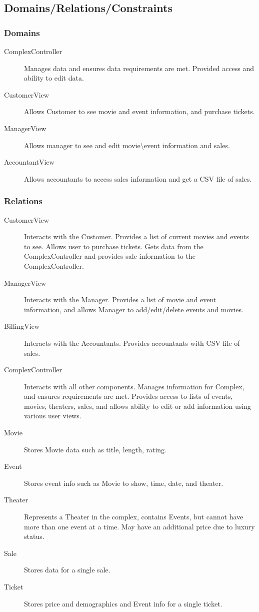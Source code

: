 \documentclass[12pt,titlepage,letterpaper]{article}
\begin{document}
\subsection{Domains/Relations/Constraints}
\subsubsection{Domains}
  	\begin{description}
\item[ComplexController] Manages data and ensures data requirements are met.  Provided access and ability to edit data.
\item[CustomerView] Allows Customer to see movie and event information, and purchase tickets.
\item[ManagerView] Allows manager to see and edit movie\textbackslash event information and sales.
\item[AccountantView] Allows accountants to access sales information and get a CSV file of sales.
\end{description}
\subsubsection{Relations}
\begin{description}
\item[CustomerView] Interacts with the Customer. Provides a list of current movies and events to see.  Allows user to purchase tickets. Gets data from the ComplexController and provides sale information to the ComplexController.

\item[ManagerView] Interacts with the Manager. Provides a list of movie and event information, and allows Manager to add/edit/delete events and movies.

\item[BillingView] Interacts with the Accountants.  Provides accountants with CSV file of sales.

\item[ComplexController] Interacts with all other components.  Manages information for Complex, and ensures requirements are met. Provides access to lists of events, movies, theaters, sales, and allows ability to edit or add information using various user views.

\item[Movie] Stores Movie data such as title, length, rating.

\item[Event] Stores event info such as Movie to show, time, date, and theater.

\item[Theater] Represents a Theater in the complex, contains Events, but cannot have more than one event at a time. May have an additional price due to luxury status.

\item[Sale] Stores data for a single sale.

\item[Ticket] Stores price and demographics and Event info for a single ticket.
\end{description}
\end{document}
